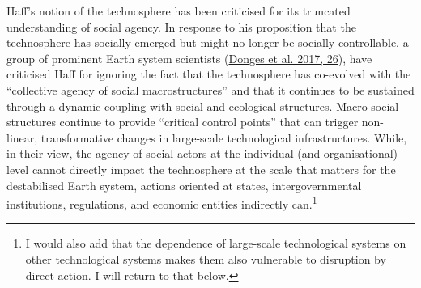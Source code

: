 \documentclass[a4paper, nobind]{templates/ociamthesis}
\begin{document}
Haff's notion of the technosphere has been criticised for its truncated understanding of social agency. In response to his proposition that the technosphere has socially emerged but might no longer be socially controllable, a group of prominent Earth system scientists (\protect\hyperlink{ref-donges_technosphere_2017}{Donges et al. 2017, 26}), have criticised Haff for ignoring the fact that the technosphere has co-evolved with the ``collective agency of social macrostructures'' and that it continues to be sustained through a dynamic coupling with social and ecological structures. Macro-social structures continue to provide ``critical control points'' that can trigger non-linear, transformative changes in large-scale technological infrastructures. While, in their view, the agency of social actors at the individual (and organisational) level cannot directly impact the technosphere at the scale that matters for the destabilised Earth system, actions oriented at states, intergovernmental institutions, regulations, and economic entities indirectly can.\footnote{I would also add that the dependence of large-scale technological systems on other technological systems makes them also vulnerable to disruption by direct action. I will return to that below.}
\end{document}
